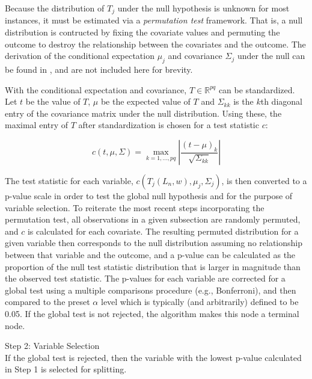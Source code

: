 Because the distribution of $T_j$ under the null hypothesis is unknown for most instances, it must be estimated via a \textit{permutation test} framework. That is, a null distribution is contructed by fixing the covariate values and permuting the outcome to destroy the relationship between the covariates and the outcome. The derivation of the conditional expectation $\mu_j$ and covariance $\Sigma_j$ under the null can be found in , and are not included here for brevity.

With the conditional expectation and covariance, $T \in \mathbb{R}^{pq}$ can be standardized. Let $t$ be the value of $T$, $\mu$ be the expected value of $T$ and $\Sigma_{kk}$ is the $k$th diagonal entry of the covariance matrix under the null distribution. Using these, the maximal entry of $T$ after standardization is chosen for a test statistic $c$:

\begin{equation}
\label{eq:stdteststat}
c(t, \mu, \Sigma) = \max_{k=1,\ldots, pq}\left | \frac{(t - \mu)_k}{\sqrt{\Sigma_{kk}}}  \right |
\end{equation}


The test statistic for each variable, $c(T_j(L_n, w), \mu_j, \Sigma_j)$, is then converted to a p-value scale in order to test the global null hypothesis and for the purpose of variable selection. To reiterate the most recent steps incorporating the permutation test, all observations in a given subsection are randomly permuted, and $c$ is calculated for each covariate. The resulting permuted distribution for a given variable then corresponds to the null distribution assuming no relationship between that variable and the outcome, and a p-value can be calculated as the proportion of the null test statistic distribution that is larger in magnitude than the observed test statistic. The p-values for each variable are corrected for a global test using a multiple comparisons procedure (e.g., Bonferroni), and then compared to the preset $\alpha$ level which is typically (and arbitrarily) defined to be 0.05. If the global test is not rejected, the algorithm makes this node a terminal node. 

\vspace{2ex}

\noindent Step 2: Variable Selection \\


If the global test is rejected, then the variable with the lowest p-value calculated in Step 1 is selected for splitting.

